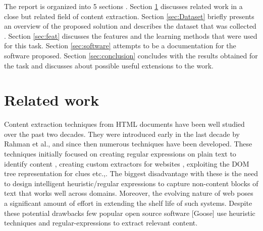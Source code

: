 \documentclass{article} %
\begin{document}
The report is organized into 5 sections . Section \ref{sec:relwork} discusses related work in a close but related field of content extraction. Section \ref{sec:Dataset} briefly presents an overview of the proposed solution and describes the dataset that was collected . Section \ref{sec:feat} discusses the features and the learning methods that were used for this task. Section \ref{sec:software} attempts to be a documentation for the software proposed. Section \ref{sec:conclusion} concludes with the results obtained for the task and discusses about possible useful extensions to the work.\\



\section{Related work}
\label{sec:relwork}

Content extraction techniques from HTML documents have been well studied over the past two decades. They were introduced early in the last decade by Rahman et al., \cite{rahmanunderstanding} and since then numerous techniques have been developed. These techniques initially focused on creating regular expressions on plain text to identify content \cite{Adelberg:1998:NTS:276305.276330} , creating custom extractors for websites \cite{buyukkoktenaccordion}, exploiting the DOM tree representation for clues \cite{Gupta:2003:DCE:775152.775182} etc.,. The biggest disadvantage with these is the need to design intelligent heuristic/regular expressions to capture non-content blocks of text that works well across domains. Moreover, the evolving nature of web poses a significant amount of effort in extending the shelf life of such systems. Despite these potential drawbacks few  popular open source software [Goose] use heuristic techniques and regular-expressions to extract relevant content. 
\end{document}
